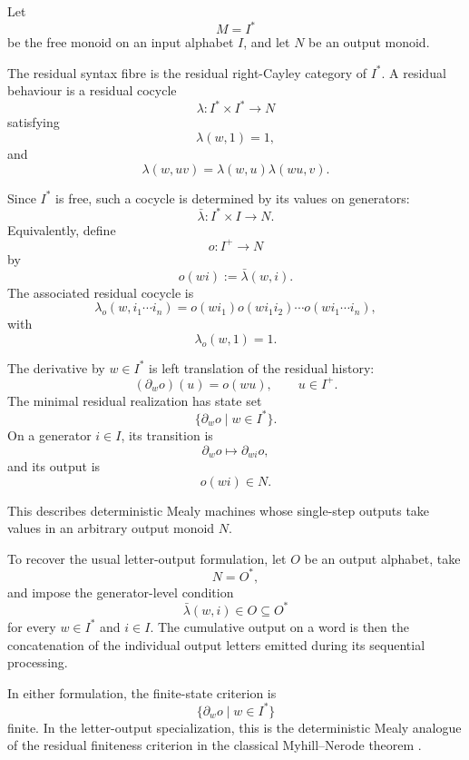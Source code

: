 \begin{example}
\label{ex:classical-deterministic-mealy-machines}
    Let
    \[
        M=I^*
    \]
    be the free monoid on an input alphabet \(I\), and let \(N\) be an output
    monoid.

    The residual syntax fibre is the residual right-Cayley category of
    \(I^*\). A residual behaviour is a residual cocycle
    \[
        \lambda:I^*\times I^*\to N
    \]
    satisfying
    \[
        \lambda(w,1)=1,
    \]
    and
    \[
        \lambda(w,uv)
        =
        \lambda(w,u)\lambda(wu,v).
    \]

    Since \(I^*\) is free, such a cocycle is determined by its values on
    generators:
    \[
        \bar\lambda:I^*\times I\to N.
    \]
    Equivalently, define
    \[
        o:I^+\to N
    \]
    by
    \[
        o(wi):=\bar\lambda(w,i).
    \]
    The associated residual cocycle is
    \[
        \lambda_o(w,i_1\cdots i_n)
        =
        o(wi_1)
        o(wi_1i_2)
        \cdots
        o(wi_1\cdots i_n),
    \]
    with
    \[
        \lambda_o(w,1)=1.
    \]

    The derivative by \(w\in I^*\) is left translation of the residual
    history:
    \[
        (\partial_w o)(u)=o(wu),
        \qquad
        u\in I^+.
    \]
    The minimal residual realization has state set
    \[
        \{\partial_w o\mid w\in I^*\}.
    \]
    On a generator \(i\in I\), its transition is
    \[
        \partial_w o
        \longmapsto
        \partial_{wi}o,
    \]
    and its output is
    \[
        o(wi)\in N.
    \]

    This describes deterministic Mealy machines whose single-step outputs
    take values in an arbitrary output monoid \(N\).

    To recover the usual letter-output formulation, let \(O\) be an output
    alphabet, take
    \[
        N=O^*,
    \]
    and impose the generator-level condition
    \[
        \bar\lambda(w,i)\in O\subseteq O^*
    \]
    for every \(w\in I^*\) and \(i\in I\). The cumulative output on a word is
    then the concatenation of the individual output letters emitted during
    its sequential processing.

    In either formulation, the finite-state criterion is
    \[
        \{\partial_w o\mid w\in I^*\}
    \]
    finite. In the letter-output specialization, this is the deterministic
    Mealy analogue of the residual finiteness criterion in the classical
    Myhill--Nerode theorem
    \cite{Myhill1957,Nerode1958,Brzozowski1964}.
\end{example}

